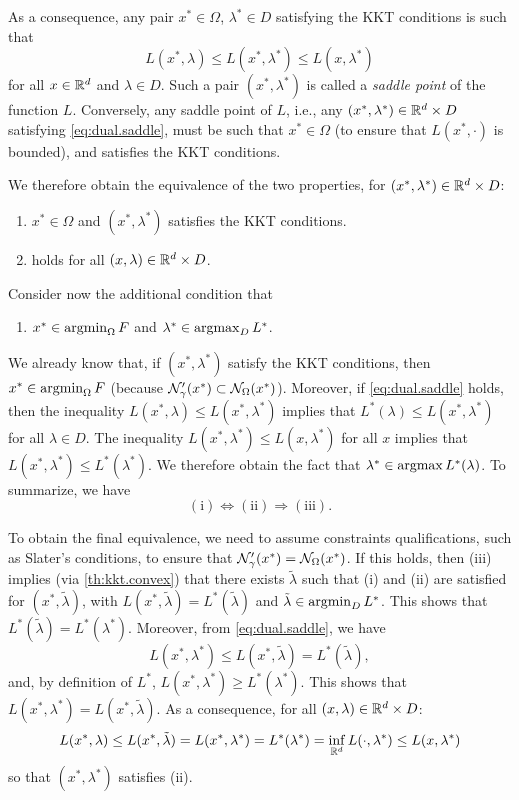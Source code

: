 As a consequence, any pair $x^*\in \Omega$, $\lambda^*\in D$ satisfying the KKT conditions is such that
\begin{equation}
L(x^*, \lambda) \leq L(x^*, \lambda^*) \leq L(x, \lambda^*)
\label{eq:dual.saddle}
\end{equation}
for all $x\in {\mathbb{R}}^d$ and $\lambda\in D$. Such a pair $(x^*, \lambda^*)$ is called a {\em saddle point} of the function $L$. Conversely, any saddle point of $L$, i.e., any $(x^*, \lambda^*)\in {\mathbb{R}}^d \times D$ satisfying  \cref{eq:dual.saddle}, must be such that $x^*\in \Omega$ (to ensure that $L(x^*, \cdot)$ is bounded), and satisfies the KKT conditions. 

We therefore obtain the equivalence of the two properties, for $(x^*, \lambda^*)\in {\mathbb{R}}^d \times D$:
\begin{enumerate}[label=(\roman*)]
\item $x^*\in \Omega$ and $(x^*, \lambda^*)$ satisfies the KKT conditions.
\item {} holds for all $(x, \lambda) \in {\mathbb{R}}^d \times D$.
\end{enumerate}

Consider now the additional condition that
\begin{enumerate}[label=(iii)]
\item $x^*\in \operatorname*{argmin}_\Omega F$ and $\lambda^* \in \operatorname*{argmax}_D L^*$.
\end{enumerate}
We already know that, if $(x^*, \lambda^*)$ satisfy the KKT conditions, then $x^* \in \operatorname*{argmin}_\Omega F$ (because ${\mathcal N}'_\gamma(x^*) \subset {\mathcal N}_\Omega(x^*)$). Moreover, if \cref{eq:dual.saddle} holds, then the  inequality $L(x^*, \lambda) \leq L(x^*, \lambda^*)$ implies that $L^*(\lambda) \leq L(x^*, \lambda^*)$ for all $\lambda\in D$. The inequality   $L(x^*, \lambda^*) \leq L(x, \lambda^*)$ for all $x$ implies that $L(x^*, \lambda^*) \leq L^*(\lambda^*)$. We therefore obtain the fact that $\lambda^*\in \operatorname*{argmax} L^*(\lambda)$. To summarize, we have
\[
\mathrm{(i)} \Leftrightarrow \mathrm{(ii)} \Rightarrow \mathrm{(iii)}.
\]

To obtain the final equivalence, we need to assume constraints qualifications, such as Slater's conditions, to ensure that ${\mathcal N}'_\gamma(x^*) = {\mathcal N}_\Omega(x^*)$. If this holds, then (iii) implies (via \cref{th:kkt.convex}) that there exists $\tilde \lambda$ such that (i) and (ii) are satisfied for $(x^*, \tilde \lambda)$, with $L(x^*, \tilde\lambda) = L^*(\tilde\lambda)$ and $\tilde \lambda\in \operatorname*{argmin}_D L^*$. This shows that $L^*(\tilde \lambda) =  L^*(\lambda^*)$. Moreover, from \cref{eq:dual.saddle}, we have
\[
L(x^*, \lambda^*) \leq L(x^*, \tilde \lambda) = L^*(\tilde \lambda),
\]
and, by definition of $L^*$, $L(x^*, \lambda^*) \geq L^*(\lambda^*)$. This shows that $L(x^*, \lambda^*) = L(x^*, \tilde \lambda)$. As a consequence, for all $(x, \lambda)\in {\mathbb{R}}^d\times D$:
\[
L(x^*, \lambda) \leq L(x^*, \tilde{\lambda}) = L(x^*, \lambda^*) = L^*(\lambda^*) = \inf_{{\mathbb{R}}^d} L(\cdot, \lambda^*) \leq L(x, \lambda^*)
\]
so that $(x^*, \lambda^*)$ satisfies (ii).



